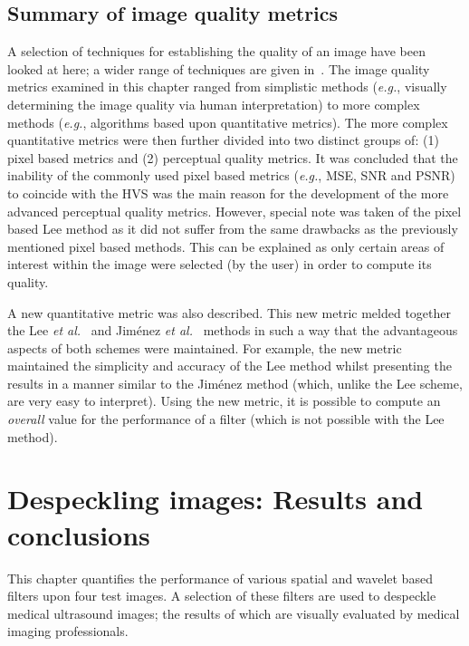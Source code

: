 \documentclass[12pt]{report}
\begin{document}
\section{Summary of image quality metrics}
\label{sumIQ}
A selection of techniques for establishing the quality of an image have been looked at here;
a wider range of techniques are given in~\cite{hermiston99, janssen2001, lambSpIs98, ridder2001, wangIQ2004, avicbas2003}.
The image quality metrics examined in this chapter ranged from simplistic methods (\emph{e.g.}, visually determining the
image quality via human interpretation) to more complex methods (\emph{e.g.}, algorithms based upon quantitative metrics).
The more complex quantitative metrics were then further divided into two distinct groups of:
(1) pixel based metrics and (2) perceptual quality metrics.
It was concluded that the inability of the commonly used pixel based metrics (\emph{e.g.}, MSE, SNR and PSNR) to coincide with the 
HVS was the main reason for the development of the more advanced perceptual quality metrics.
However, special note was taken of the pixel based Lee \cite{lee94} method as it did not
suffer from the same drawbacks as the previously mentioned pixel based methods.
This can be explained as only certain areas of interest within the image were selected (by the user) in order to
compute its quality.

A new quantitative metric was also described. This new metric melded together the 
Lee \emph{et al.}~\cite{lee94} and Jim\'enez \emph{et al.}~\cite{jim2001} methods in such a way that the advantageous aspects
of both schemes were maintained. 
For example, the new metric maintained the simplicity and accuracy of the Lee method whilst 
presenting the results in a manner similar to the Jim\'enez method (which, unlike the Lee scheme, are very 
easy to interpret). Using the new metric, 
it is possible to compute an \emph{overall} value for the performance of a filter (which is not possible with the Lee method).

			
\chapter{Despeckling images: Results and conclusions}
\label{ch:resConcDN}

This chapter quantifies the performance of various spatial and wavelet based filters upon four test images. 
A selection of these filters are used to despeckle medical ultrasound images; the results of which are
visually evaluated by medical imaging professionals.
\end{document}
